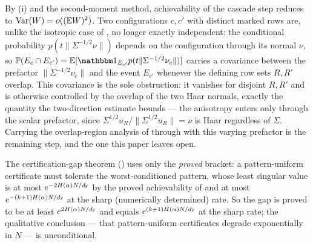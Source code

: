 \begin{remark}\label{rem:aniso-second}
By (i) and the second-moment method, achievability of the cascade step reduces to
$\operatorname{Var}(W)=o((\mathbb{E} W)^2)$. Two configurations $c,c'$ with distinct marked rows are, unlike the isotropic
case of , no longer exactly independent: the conditional probability
$p(t\|\Sigma^{-1/2}\nu\|)$ depends on the configuration through its normal $\nu$, so
$\PP(E_c\cap E_{c'})=\EE[\one_{E_{c'}}p(t\|\Sigma^{-1/2}\nu_c\|)]$ carries a covariance between the
prefactor $\|\Sigma^{-1/2}\nu_c\|$ and the event $E_{c'}$ whenever the defining row sets $R,R'$ overlap.
This covariance is the sole obstruction: it vanishes for disjoint $R,R'$ and is otherwise controlled by
the overlap of the two Haar normals, exactly the quantity the two-direction estimate
 bounds --- the anisotropy enters only through the scalar prefactor, since
$\Sigma^{1/2}u_R/\|\Sigma^{1/2}u_R\|=\nu$ is Haar regardless of $\Sigma$. Carrying the overlap-region
analysis of  through with this varying prefactor is the remaining step, and the one
this paper leaves open.
\end{remark}

\begin{remark}\label{rem:app-needs}
The certification-gap theorem () uses only the \emph{proved} bracket: a pattern-uniform
certificate must tolerate the worst-conditioned pattern, whose least singular value is at most
$e^{-2H(\alpha)N/d_{\mathbb{F}}}$ by the proved achievability of  and at most
$e^{-(k+1)H(\alpha)N/d_{\mathbb{F}}}$ at the sharp (numerically determined) rate. So the gap is proved to be at least
$e^{2H(\alpha)N/d_{\mathbb{F}}}$ and equals $e^{(k+1)H(\alpha)N/d_{\mathbb{F}}}$ at the sharp rate; the qualitative conclusion ---
that pattern-uniform certificates degrade exponentially in $N$ --- is unconditional.
\end{remark}
